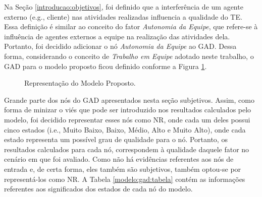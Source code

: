 Na Seção \ref{introducao:objetivos}, foi definido que a interferência de um agente externo (e.g., cliente) nas atividades realizadas influencia a qualidade do TE. Essa definição é similar ao conceito do fator \textit{Autonomia da Equipe}, que refere-se à influência de agentes externos a equipe na realização das atividades dela. Portanto, foi decidido adicionar o nó \textit{Autonomia da Equipe} ao GAD. Dessa forma, considerando o conceito de \textit{Trabalho em Equipe} adotado neste trabalho, o GAD para o modelo proposto ficou definido conforme a Figura \ref{modelo:gad:final}.

\begin{figure}[ht!]
\begin{center}
	\end{center}
	\caption{Representação do Modelo Proposto.}
	\label{modelo:gad:final}
\end{figure}

Grande parte dos nós do GAD apresentados nesta seção subjetivos. Assim, como forma de minizar o viés que pode ser introduzido nos resultados calculados pelo modelo, foi decidido representar esses nós como NR, onde cada um deles possui cinco estados (i.e., Muito Baixo, Baixo, Médio, Alto e Muito Alto), onde cada estado representa um possível grau de qualidade para o nó. Portanto, os resultados calculados para cada nó, correspondem à qualidade daquele fator no cenário em que foi avaliado. Como não há evidências referentes aos nós de entrada e, de certa forma, eles também são subjetivos, também optou-se por representá-los como NR. A Tabela \ref{modelo:gad:tabela} contém as informações referentes aos significados dos estados de cada nó do modelo.

